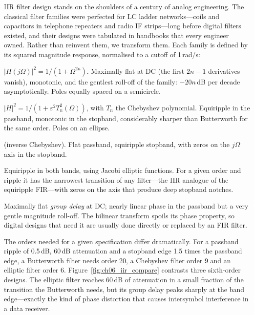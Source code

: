 IIR filter design stands on the shoulders of a century of analog engineering. The classical filter
families were perfected for LC ladder networks---coils and capacitors in telephone repeaters and
radio IF strips---long before digital filters existed, and their designs were tabulated in
handbooks that every engineer owned. Rather than reinvent them, we transform them. Each family is
defined by its squared magnitude response, normalised to a cutoff of 1\,rad/s:
\begin{description}[style=nextline,leftmargin=1.2em,font=\sffamily\bfseries\small\color{navy}]
\item[Butterworth.] $|H(j\Omega)|^2=1/(1+\Omega^{2n})$. Maximally flat at DC (the first $2n-1$
derivatives vanish), monotonic, and the gentlest roll-off of the family: $-20n$\,dB per decade
asymptotically. Poles equally spaced on a semicircle.
\item[Chebyshev type I.] $|H|^2=1/(1+\varepsilon^2T_n^2(\Omega))$, with $T_n$ the Chebyshev
polynomial. Equiripple in the passband, monotonic in the stopband, considerably sharper than
Butterworth for the same order. Poles on an ellipse.
\item[Chebyshev type II] (inverse Chebyshev). Flat passband, equiripple stopband, with zeros on
the $j\Omega$ axis in the stopband.
\item[Elliptic (Cauer).] Equiripple in both bands, using Jacobi elliptic functions. For a given
order and ripple it has the narrowest transition of any filter---the IIR analogue of the
equiripple FIR---with zeros on the axis that produce deep stopband notches.
\item[Bessel (Thomson).] Maximally flat \emph{group delay} at DC; nearly linear phase in the
passband but a very gentle magnitude roll-off. The bilinear transform spoils its phase property,
so digital designs that need it are usually done directly or replaced by an FIR filter.
\end{description}
The orders needed for a given specification differ dramatically. For a passband ripple of 0.5\,dB,
60\,dB attenuation and a stopband edge 1.5 times the passband edge, a Butterworth filter needs
order 20, a Chebyshev filter order 9 and an elliptic filter order 6. Figure~\ref{fig:ch06_iir_compare}
contrasts three sixth-order designs. The elliptic filter reaches 60\,dB of attenuation in a small
fraction of the transition the Butterworth needs, but its group delay peaks sharply at the band
edge---exactly the kind of phase distortion that causes intersymbol interference in a data
receiver.

